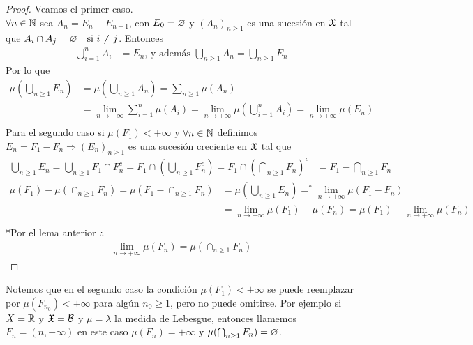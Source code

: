 \begin{lemma}
    \begin{proof}
        Veamos el primer caso. \\
        \(\forall n \in \mathbb{N}\) sea \(A_n = E_n - E_{n - 1}\), con \(E_0 = \varnothing\) y \((A_n)_{n \geq 1}\) es una sucesión en \(\mathfrak{X}\) tal que \(A_i \cap A_j = \varnothing \quad \text{si } i \neq j\).
        Entonces \begin{align*}
            \bigcup_{i = 1}^n A_i & = E_n \text{, y además } \bigcup_{n \geq 1} A_n = \bigcup_{n \geq 1} E_n
        \end{align*}
        Por lo que \begin{align*}
            \mu(\bigcup_{n \geq 1} E_n) & = \mu(\bigcup_{n \geq 1} A_n) = \sum_{n \geq 1} \mu(A_n)                                                                          \\
                                        & = \lim_{n \to +\infty} \sum_{i = 1}^n \mu(A_i) = \lim_{n \to +\infty} \mu(\bigcup_{i = 1}^n A_i)  = \lim_{n \to +\infty} \mu(E_n) \\
        \end{align*}
        Para el segundo caso si \(\mu(F_1) < +\infty\) y \(\forall n \in \mathbb{N}\) definimos \(E_n = F_1 - F_n \Rightarrow (E_n)_{n \geq 1}\) es una sucesión creciente en \(\mathfrak{X}\) tal que \begin{align*}
            \bigcup_{n \geq 1} E_n = \bigcup_{n \geq 1} F_1 \cap F_n^c = F_1 \cap (\bigcup_{n \geq 1} F_n^c) = F_1 \cap (\bigcap_{n \geq 1} F_n)^c & = F_1 - \bigcap_{n \geq 1} F_n
        \end{align*}
        \begin{align*}
            \mu(F_1) - \mu(\cap_{n \geq 1} F_n) = \mu(F_1 - \cap_{n \geq 1} F_n) & = \mu(\bigcup_{n \geq 1} E_n) =^{*} \lim_{n \to +\infty} \mu(F_1 - F_n)               \\
                                                                                 & = \lim_{n \to +\infty} \mu(F_1) - \mu(F_n) = \mu(F_1) - \lim_{n \to +\infty} \mu(F_n) \\
        \end{align*}
        *Por el lema anterior \( \therefore \) \begin{align*}
            \lim_{n \to +\infty} \mu(F_n) = \mu(\cap_{n \geq 1} F_n)
        \end{align*}
    \end{proof}
\end{lemma}

\clearpage

Notemos que en el segundo caso la condición \(\mu(F_1) < +\infty\) se puede reemplazar por \(\mu(F_{n_0}) < +\infty\) para algún \(n_0 \geq 1\), pero no puede omitirse.
Por ejemplo si \(X = \mathbb{R}\) y \(\mathfrak{X} = \mathcal{B}\) y \(\mu = \lambda\) la medida de Lebesgue, entonces llamemos \(F_n = (n, +\infty)\) en este caso
\(\mu(F_n) = +\infty\) y \(\mu(\bigcap_{n \geq 1} F_n) = \varnothing\).

